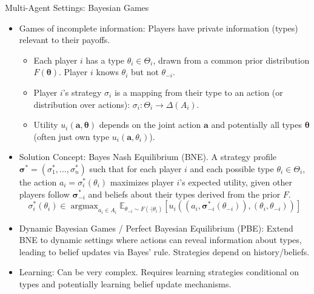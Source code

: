 \documentclass[10pt]{beamer}
\newcommand{\E}{\mathbb{E}}
\DeclareMathOperator*{\argmax}{argmax} %
\begin{document}

\begin{frame}{Multi-Agent Settings: Bayesian Games}
    \begin{itemize}
        \item Games of incomplete information: Players have private information (types) relevant to their payoffs.
        \begin{itemize}
            \item Each player $i$ has a type $\theta_i \in \Theta_i$, drawn from a common prior distribution $F(\boldsymbol{\theta})$. Player $i$ knows $\theta_i$ but not $\theta_{-i}$.
            \item Player $i$'s strategy $\sigma_i$ is a mapping from their type to an action (or distribution over actions): $\sigma_i: \Theta_i \rightarrow \Delta(A_i)$.
            \item Utility $u_i(\mathbf{a}, \boldsymbol{\theta})$ depends on the joint action $\mathbf{a}$ and potentially all types $\boldsymbol{\theta}$ (often just own type $u_i(\mathbf{a}, \theta_i)$).
        \end{itemize}
        \vspace{0.2cm}
        \item Solution Concept: Bayes Nash Equilibrium (BNE). A strategy profile $\boldsymbol{\sigma}^* = (\sigma^*_1, ..., \sigma^*_n)$ such that for each player $i$ and each possible type $\theta_i \in \Theta_i$, the action $a_i = \sigma^*_i(\theta_i)$ maximizes player $i$'s expected utility, given other players follow $\boldsymbol{\sigma}^*_{-i}$ and beliefs about their types derived from the prior $F$.
        \begin{equation*}
         \sigma_i^*(\theta_i) \in \argmax_{a_i \in A_i} \E_{\theta_{-i} \sim F(\cdot|\theta_i)} \left[ u_i( (a_i, \boldsymbol{\sigma}^*_{-i}(\theta_{-i})), (\theta_i, \theta_{-i}) ) \right]
        \end{equation*}
        \vspace{0.2cm}
        \item Dynamic Bayesian Games / Perfect Bayesian Equilibrium (PBE): Extend BNE to dynamic settings where actions can reveal information about types, leading to belief updates via Bayes' rule. Strategies depend on history/beliefs.
        \vspace{0.2cm}
        \item Learning: Can be very complex. Requires learning strategies conditional on types and potentially learning belief update mechanisms.
    \end{itemize}
\end{frame}
\end{document}
